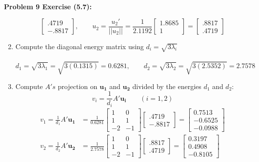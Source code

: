 \documentclass[11pt]{article}
\newenvironment{problem}[1]{\textbf{Problem #1: }}{\newpage}
\begin{document}
\begin{problem}{9 Exercise (5.7)}
\begin{enumerate}[label = (\alph*)]
\[{\begin{bmatrix}
				.4719 \\ -.8817
			\end{bmatrix}}, \qquad  u_2 = \frac{u_2'}{||u_2||} = \frac{1}{2.1192}\begin{bmatrix}
				1.8685 \\ 1
			\end{bmatrix} = \boldsymbol{\begin{bmatrix}
				.8817 \\ .4719
			\end{bmatrix}}\]
				\newpage
			\item Compute the diagonal energy matrix using $d_i = \sqrt{3\lambda_i}$
			\\ \\
			\[d_1 = \sqrt{3\lambda_1} = \sqrt{3(0.1315)} = \boldsymbol{0.6281}, \qquad d_2 = \sqrt{3\lambda_2} = \sqrt{3(2.5352)} = \boldsymbol{2.7578} \]
			\item Compute $A's$ projection on $\boldsymbol{u_1}$ and $\boldsymbol{u_2}$ divided by the energies $d_1$ and $d_2$:
			\[v_i = \frac{1}{d_i}A'\boldsymbol{u_i} \qquad (i = 1,2)\]
			\begin{align*}
				v_1 = \frac{1}{d_1}A'\boldsymbol{u_1} &= \frac{1}{0.6281}\begin{bmatrix}
					1 & 0 \\
					1 & 1 \\
					-2 & -1 
				\end{bmatrix}\begin{bmatrix}
					.4719 \\ -.8817
				\end{bmatrix} = \boldsymbol{\begin{bmatrix}
					0.7513 \\
					-0.6525 \\
					-0.0988
				\end{bmatrix}} \\
				v_2 = \frac{1}{d_2}A'\boldsymbol{u_2} &= \frac{1}{2.7578}\begin{bmatrix}
					1 & 0 \\
					1 & 1 \\
					-2 & -1 
				\end{bmatrix}\begin{bmatrix}
					.8817 \\ .4719
				\end{bmatrix} = \boldsymbol{\begin{bmatrix}
					0.3197 \\
					0.4908 \\
					-0.8105

\end{bmatrix}}
\end{align*}
\end{enumerate}
\end{problem}
\end{document}
